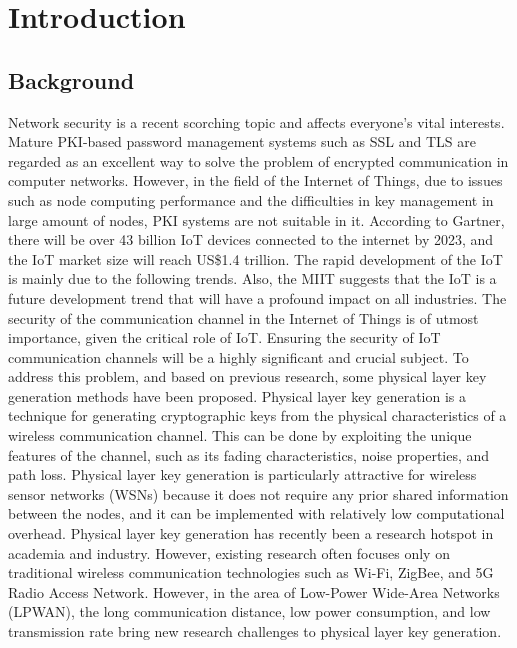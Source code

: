 
\chapter{Introduction}

\section{Background}

Network security is a recent scorching topic and affects everyone's vital interests. Mature PKI-based password management systems such as SSL and TLS are regarded as an excellent way to solve the problem of encrypted communication in computer networks. However, in the field of the Internet of Things, due to issues such as node computing performance and the difficulties in key management in large amount of nodes, PKI systems are not suitable in it. 
According to Gartner\cite{gartnerresearchiot}, there will be over 43 billion IoT devices connected to the internet by 2023, and the IoT market size will reach US\$1.4 trillion. The rapid development of the IoT is mainly due to the following trends. Also, the MIIT suggests that the IoT is a future development trend that will have a profound impact on all industries\cite{iot13th5yr}. The security of the communication channel in the Internet of Things is of utmost importance, given the critical role of IoT. Ensuring the security of IoT communication channels will be a highly significant and crucial subject.
To address this problem, and based on previous research, some physical layer key generation methods have been proposed. Physical layer key generation is a technique for generating cryptographic keys from the physical characteristics of a wireless communication channel. This can be done by exploiting the unique features of the channel, such as its fading characteristics, noise properties, and path loss. Physical layer key generation is particularly attractive for wireless sensor networks (WSNs) because it does not require any prior shared information between the nodes, and it can be implemented with relatively low computational overhead.
Physical layer key generation has recently been a research hotspot in academia and industry\cite{7120014}. However, existing research often focuses only on traditional wireless communication technologies such as Wi-Fi, ZigBee, and 5G Radio Access Network. However, in the area of Low-Power Wide-Area Networks (LPWAN)\cite{iotfactorylpwan}, the long communication distance, low power consumption, and low transmission rate bring new research challenges to physical layer key generation.
